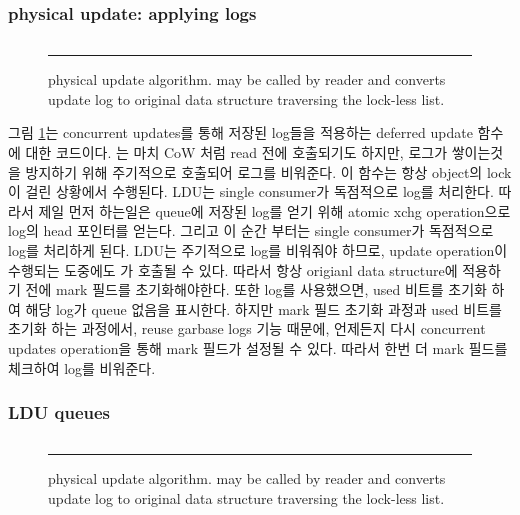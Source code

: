 \fi


\subsubsection{physical update: applying logs}


\begin{figure}[tb!]
\inputminted[linenos,fontsize=\footnotesize, tabsize=2]{c}{src/ldu_physical.c}
\rule{\columnwidth}{0.5pt}
\vspace{-\baselineskip}
\caption{ physical update algorithm.  may be
 called by reader and converts update log to original data structure
 traversing the lock-less list.}
\label{fig:glduphysicalupdate}
\end{figure}

\ifkor
그림 \ref{fig:glduphysicalupdate}는 concurrent updates를 통해 저장된 log들을 적용하는 deferred
update 함수에 대한 코드이다.
는 마치 CoW 처럼 read 전에 호출되기도 하지만, 로그가 쌓이는것을 방지하기 위해 주기적으로
호출되어 로그를 비워준다.
이 함수는 항상 object의 lock이 걸린 상황에서 수행된다. 
LDU는 single consumer가 독점적으로 log를 처리한다.
따라서 제일 먼저 하는일은 queue에 저장된 log를 얻기 위해 atomic xchg operation으로 log의 head 포인터를
얻는다.
그리고 이 순간 부터는 single consumer가 독점적으로 log를 처리하게 된다.
LDU는 주기적으로 log를 비워줘야 하므로, update operation이 수행되는 도중에도 가
호출될 수 있다.
따라서 항상 origianl data structure에 적용하기 전에 mark 필드를 초기화해야한다.
또한 log를 사용했으면, used 비트를 초기화 하여 해당 log가 queue 없음을 표시한다.
하지만 mark 필드 초기화 과정과 used 비트를 초기화 하는 과정에서, reuse garbase logs 기능 때문에,
언제든지 다시 concurrent updates operation을 통해 mark 필드가 설정될 수 있다.
따라서 한번 더 mark 필드를 체크하여 log를 비워준다.
\else

\fi

\ifkorthesis
\subsubsection{LDU queues}
\begin{figure}[tb!]
\inputminted[linenos,fontsize=\footnotesize, tabsize=2]{c}{src/ldu_queue.c}
\rule{\columnwidth}{0.5pt}
\vspace{-\baselineskip}
\caption{ physical update algorithm.  may be
 called by reader and converts update log to original data structure
 traversing the lock-less list.}
\label{fig:lduqueue}
\end{figure}

